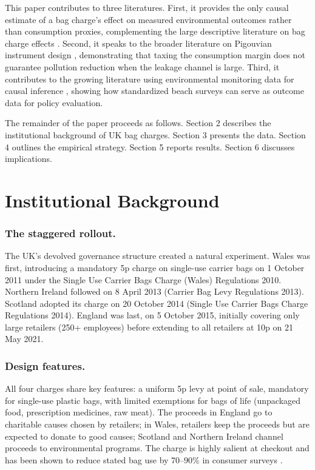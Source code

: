 \documentclass[12pt]{article}
\begin{document}
This paper contributes to three literatures. First, it provides the only causal estimate of a bag charge's effect on measured environmental outcomes rather than consumption proxies, complementing the large descriptive literature on bag charge effects \citep{convery_most_2007, dikgang_analysis_2012, rivers_what_2017, taylor_bag_2020}. Second, it speaks to the broader literature on Pigouvian instrument design \citep{pigou_economics_1920, fullerton_tax_2020}, demonstrating that taxing the consumption margin does not guarantee pollution reduction when the leakage channel is large. Third, it contributes to the growing literature using environmental monitoring data for causal inference \citep{currie_what_2014, deryugina_mortality_2019, marcus_effects_2021}, showing how standardized beach surveys can serve as outcome data for policy evaluation.

The remainder of the paper proceeds as follows. Section 2 describes the institutional background of UK bag charges. Section 3 presents the data. Section 4 outlines the empirical strategy. Section 5 reports results. Section 6 discusses implications.

\section{Institutional Background}

\subsubsection*{The staggered rollout.} The UK's devolved governance structure created a natural experiment. Wales was first, introducing a mandatory 5p charge on single-use carrier bags on 1 October 2011 under the Single Use Carrier Bags Charge (Wales) Regulations 2010. Northern Ireland followed on 8 April 2013 (Carrier Bag Levy Regulations 2013). Scotland adopted its charge on 20 October 2014 (Single Use Carrier Bags Charge Regulations 2014). England was last, on 5 October 2015, initially covering only large retailers (250+ employees) before extending to all retailers at 10p on 21 May 2021.

\subsubsection*{Design features.} All four charges share key features: a uniform 5p levy at point of sale, mandatory for single-use plastic bags, with limited exemptions for bags of life (unpackaged food, prescription medicines, raw meat). The proceeds in England go to charitable causes chosen by retailers; in Wales, retailers keep the proceeds but are expected to donate to good causes; Scotland and Northern Ireland channel proceeds to environmental programs. The charge is highly salient at checkout and has been shown to reduce stated bag use by 70--90\% in consumer surveys \citep{poortinga_english_2013, thomas_incentivising_2019}.
\end{document}
